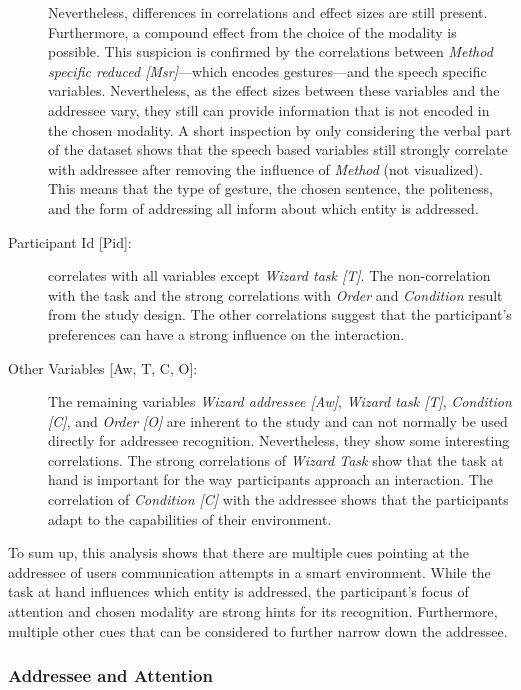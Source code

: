 \begin{description}
    Nevertheless, differences in correlations and effect sizes are still present.
    Furthermore, a compound effect from the choice of the modality is possible.
    This suspicion is confirmed by the correlations between \emph{Method specific reduced [Msr]}---which encodes gestures---and the speech specific variables.
    Nevertheless, as the effect sizes between these variables and the \gls{addressee} vary, they still can provide information that is not encoded in the chosen modality.
    A short inspection by only considering the verbal part of the dataset shows that the speech based variables still strongly correlate with \gls{addressee} after removing the influence of \emph{Method} (not visualized).
    This means that the type of gesture, the chosen sentence, the politeness, and the form of addressing all inform about which entity is addressed.
    \item[{Participant Id [Pid]:}] correlates with all variables except \emph{Wizard task [T]}.
    The non-correlation with the task and the strong correlations with \emph{Order} and \emph{Condition} result from the study design.
    The other correlations suggest that the participant's preferences can have a strong influence on the interaction.
    \item[{Other Variables [Aw, T, C, O]:}] The remaining variables \emph{Wizard \gls{addressee} [Aw]}, \emph{Wizard task [T]}, \emph{Condition [C]}, and \emph{Order [O]} are inherent to the study and can not normally be used directly for \gls{addressee} recognition.
    Nevertheless, they show some interesting correlations.
    The strong correlations of \emph{Wizard Task} show that the task at hand is important for the way participants approach an interaction.
    The correlation of \emph{Condition [C]} with the \gls{addressee} shows that the participants adapt to the capabilities of their environment.
\end{description}
To sum up, this analysis shows that there are multiple cues pointing at the \gls{addressee} of \naive{} users communication attempts in a \gls{smart environment}.
While the task at hand influences which entity is addressed, the participant's focus of attention and chosen modality are strong hints for its recognition.
Furthermore, multiple other cues that can be considered to further narrow down the \gls{addressee}.

\subsubsection{Addressee and Attention}\label{sec:addressee-equals-attention}

